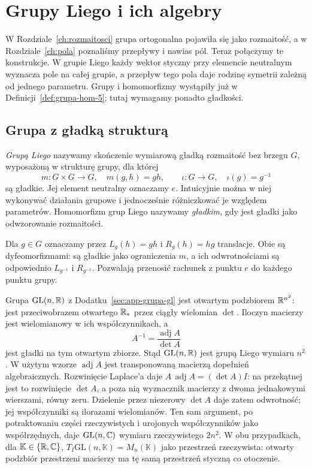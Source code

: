 \chapter{Grupy Liego i ich algebry}
\label{ch:grupy-liego}

W Rozdziale~\ref{ch:rozmaitosci} grupa ortogonalna pojawiła się jako
rozmaitość, a w Rozdziale~\ref{ch:pola} poznaliśmy przepływy i nawias pól.
Teraz połączymy te konstrukcje. W grupie Liego każdy wektor styczny
przy elemencie neutralnym wyznacza pole na całej grupie, a przepływ
tego pola daje rodzinę symetrii zależną od jednego parametru.
Grupy i homomorfizmy wystąpiły już w
Definicji~\ref{def:grupa-hom-5}; tutaj wymagamy ponadto gładkości.

\section{Grupa z gładką strukturą}
\label{sec:grupy-liego-przyklady}

\begin{definicja}
\label{def:grupa-liego}
\emph{Grupą Liego} nazywamy skończenie wymiarową gładką rozmaitość
bez brzegu $G$, wyposażoną w strukturę grupy, dla której
\[
 m:G\times G\longrightarrow G,\quad m(g,h)=gh,
 \qquad \iota:G\longrightarrow G,\quad\iota(g)=g^{-1}
\]
są gładkie. Jej element neutralny oznaczamy $e$.
Intuicyjnie można w niej wykonywać działania grupowe i jednocześnie
różniczkować je względem parametrów. Homomorfizm grup Liego nazywamy
\emph{gładkim}, gdy jest gładki jako odwzorowanie rozmaitości.
\end{definicja}

Dla $g\in G$ oznaczamy przez $L_g(h)=gh$ i $R_g(h)=hg$
translacje. Obie są dyfeomorfizmami: są gładkie jako ograniczenia
$m$, a ich odwrotnościami są odpowiednio $L_{g^{-1}}$ i
$R_{g^{-1}}$. Pozwalają przenosić rachunek z punktu $e$ do
każdego punktu grupy.

\begin{przyklad}
\label{prz:gl-liego}
Grupa $\mathrm{GL}(n,\mathbb{R})$ z
Dodatku~\ref{sec:app-grupa-gl} jest otwartym podzbiorem
$\mathbb{R}^{n^2}$: jest przeciwobrazem otwartego $\mathbb{R}_*$
przez ciągły wielomian $\det$.
Iloczyn macierzy jest wielomianowy w ich współczynnikach, a
\[
 A^{-1}=\frac{\operatorname{adj}A}{\det A}
\]
jest gładki na tym otwartym zbiorze. Stąd $\mathrm{GL}(n,\mathbb{R})$
jest grupą Liego wymiaru $n^2$.
W użytym wzorze $\operatorname{adj}A$ jest transponowaną macierzą
dopełnień algebraicznych. Rozwinięcie Laplace'a daje
$A\,\operatorname{adj}A=(\det A)I$: na przekątnej jest to
rozwinięcie $\det A$, a poza nią wyznacznik macierzy
z dwoma jednakowymi wierszami, równy zeru.
Dzielenie przez niezerowy $\det A$ daje zatem odwrotność;
jej współczynniki są ilorazami wielomianów.
Ten sam argument, po potraktowaniu
części rzeczywistych i urojonych współczynników jako współrzędnych,
daje $\mathrm{GL}(n,\mathbb{C})$ wymiaru rzeczywistego $2n^2$.
W obu przypadkach, dla $\mathbb K\in\{\mathbb{R},\mathbb{C}\}$,
$T_I\mathrm{GL}(n,\mathbb K)=M_n(\mathbb K)$
jako przestrzeń rzeczywista: otwarty podzbiór przestrzeni macierzy
ma tę samą przestrzeń styczną co otoczenie.
\end{przyklad}

